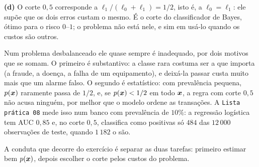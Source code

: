 \documentclass[11pt,a4paper]{article}
\begin{document}
\begin{solucao}
\smallskip
\textbf{(d)} O corte $0{,}5$ corresponde a $\ell_1/(\ell_0+\ell_1)=1/2$, isto é, a
$\ell_0=\ell_1$: ele supõe que os dois erros custam o mesmo. É o corte do classificador
de Bayes, ótimo para o risco $0$--$1$; o problema não está nele, e sim em usá-lo
quando os custos são outros.

Num problema desbalanceado ele quase sempre é inadequado, por dois motivos que se
somam. O primeiro é substantivo: a classe rara costuma ser a que importa (a fraude, a
doença, a falha de um equipamento), e deixá-la passar custa muito mais que um alarme
falso. O segundo é estatístico: com prevalência pequena, $p(\bm{x})$ raramente passa de
$1/2$, e, se $p(\bm{x})<1/2$ em todo $\bm{x}$, a regra com corte $0{,}5$ não acusa ninguém, por
melhor que o modelo ordene as transações. A \texttt{Lista prática 08} mede isso num
banco com prevalência de $10\%$: a regressão logística tem AUC $0{,}85$ e, no corte
$0{,}5$, classifica como positivas só $484$ das $12\,000$ observações de teste, quando
$1\,182$ o são.

A conduta que decorre do exercício é separar as duas tarefas: primeiro estimar bem
$p(\bm{x})$, depois escolher o corte pelos custos do problema.
\end{solucao}
\end{document}
